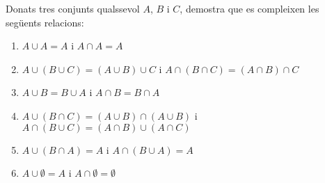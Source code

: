 \begin{exercici}
Donats tres conjunts qualssevol $A$, $B$ i $C$, demostra que es compleixen
les seg\"{u}ents relacions:

\begin{enumerate}
\item $A\cup A=A$ i $A\cap A=A$

\item $A\cup (B\cup C)=(A\cup B)\cup C$ i $A\cap (B\cap C)=(A\cap B)\cap C$

\item $A\cup B=B\cup A$ i $A\cap B=B\cap A$

\item $A\cup (B\cap C)=(A\cup B)\cap (A\cup B)$ i $A\cap (B\cup C)=(A\cap
B)\cup (A\cap C)$

\item $A\cup (B\cap A)=A$ i $A\cap (B\cup A)=A$

\item $A\cup \emptyset =A$ i $A\cap \emptyset =\emptyset $
\end{enumerate}
\end{exercici}

